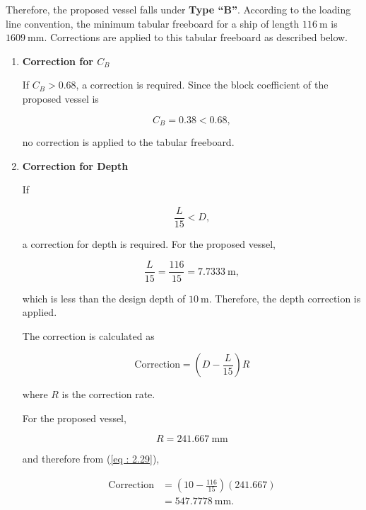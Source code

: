 \documentclass[12pt,a4paper,twoside]{report}
\begin{document}
\vspace{\baselineskip} \par \noindent Therefore, the proposed vessel falls under \textbf{Type ``B''}. According to
the loading line convention, the minimum tabular freeboard for a ship of
length $116~\mathrm{m}$ is $1609~\mathrm{mm}$. Corrections are applied
to this tabular freeboard as described below.

\begin{enumerate}[\alph*)]

    \item \textbf{Correction for $C_B$}

    If $C_B > 0.68$, a correction is required. Since the block
    coefficient of the proposed vessel is

    \[
    C_B = 0.38 < 0.68,
    \]

    no correction is applied to the tabular freeboard.

    \item \textbf{Correction for Depth}

    If

    \[
    \frac{L}{15} < D,
    \]

    \vspace{\baselineskip} \par \noindent a correction for depth is required. For the proposed vessel,

    \[
    \frac{L}{15}
    = \frac{116}{15}
    = 7.7333~\mathrm{m},
    \]

    which is less than the design depth of $10~\mathrm{m}$.
    Therefore, the depth correction is applied.

    The correction is calculated as

    \begin{equation}
    \text{Correction}
    =
    \left(D-\frac{L}{15}\right)R
    \label{eq : 2.29}
    \end{equation}

    where $R$ is the correction rate.

    For the proposed vessel,

    \[
    R = 241.667~\mathrm{mm}
    \]

    and therefore from (\ref{eq : 2.29}),

    \[
    \begin{aligned}
    \text{Correction}
    &=
    \left(10-\frac{116}{15}\right)(241.667)\\
    &= 547.7778~\mathrm{mm}.
    \end{aligned}
    \]


\end{enumerate}
\end{document}
